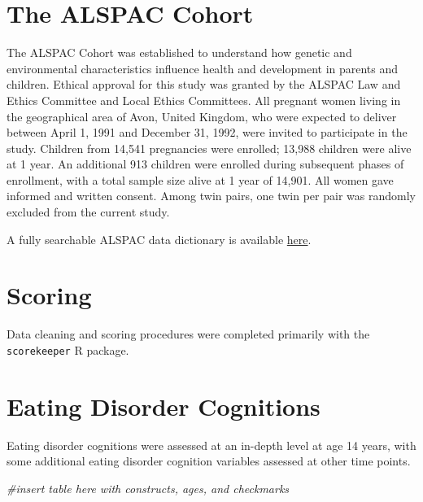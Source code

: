 \documentclass[
]{book}
\newenvironment{Shaded}{\begin{snugshade}}{\end{snugshade}}
\newcommand{\CommentTok}[1]{\textcolor[rgb]{0.56,0.35,0.01}{\textit{#1}}}
\begin{document}
\hypertarget{the-alspac-cohort}{%
\chapter{The ALSPAC Cohort}\label{the-alspac-cohort}}

The ALSPAC Cohort \citep{boydCohortProfileChildren2013, fraserCohortProfileAvon2013} was established to understand how genetic and environmental characteristics influence health and development in parents and children. Ethical approval for this study was granted by the ALSPAC Law and Ethics Committee and Local Ethics Committees. All pregnant women living in the geographical area of Avon, United Kingdom, who were expected to deliver between April 1, 1991 and December 31, 1992, were invited to participate in the study. Children from 14,541 pregnancies were enrolled; 13,988 children were alive at 1 year. An additional 913 children were enrolled during subsequent phases of enrollment, with a total sample size alive at 1 year of 14,901. All women gave informed and written consent. Among twin pairs, one twin per pair was randomly excluded from the current study.

A fully searchable ALSPAC data dictionary is available \href{http://www.bris.ac.uk/alspac/researchers/data-access/data-dictionary/}{here}.

\hypertarget{scoring}{%
\chapter{Scoring}\label{scoring}}

Data cleaning and scoring procedures were completed primarily with the \texttt{scorekeeper} R package.

\hypertarget{eating-disorder-cognitions}{%
\chapter{Eating Disorder Cognitions}\label{eating-disorder-cognitions}}

Eating disorder cognitions were assessed at an in-depth level at age 14 years, with some additional eating disorder cognition variables assessed at other time points.

\begin{Shaded}
\begin{Highlighting}[]
\CommentTok{\#insert table here with constructs, ages, and checkmarks}
\end{Highlighting}
\end{Shaded}
\end{document}

